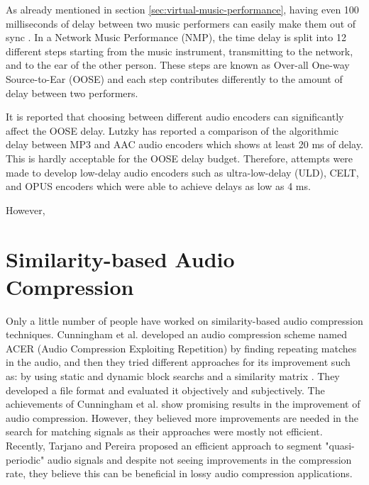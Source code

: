 As already mentioned in section \ref{sec:virtual-music-performance}, having even 100 milliseconds of delay between two music performers can easily make them out of sync \cite{chafe2004effect,bartlette2006effect}. In a Network Music Performance (NMP), the time delay is split into 12 different steps starting from the music instrument, transmitting to the network, and to the ear of the other person. These steps are known as Over-all One-way Source-to-Ear (OOSE) and each step contributes differently to the amount of delay between two performers\cite{carot2009fundamentals, rottondi2016overview}.

It is reported that choosing between different audio encoders can significantly affect the OOSE delay. Lutzky has reported a comparison of the algorithmic delay between MP3 and AAC audio encoders which shows at least 20 ms of delay\cite{lutzky2004guideline}. This is hardly acceptable for the OOSE delay budget. Therefore, attempts were made to develop low-delay audio encoders such as ultra-low-delay (ULD)\cite{schuller2002perceptual}, CELT\cite{valin2009full}, and OPUS\cite{valin2016high} encoders which were able to achieve delays as low as 4 ms. 


However, 

\section{Similarity-based Audio Compression}

Only a little number of people have worked on similarity-based audio compression techniques. Cunningham et al. developed an audio compression scheme named ACER (Audio Compression Exploiting Repetition) by finding repeating matches in the audio\cite{cunningham2005play}, and then they tried different approaches for its improvement such as: by using static and dynamic block searchs\cite{cunningham2007advances} and a similarity matrix \cite{cunningham2014data}. They developed a file format\cite{cunningham2009audio} and evaluated it objectively and subjectively\cite{cunningham2013initial,cunningham2019subjective}. The achievements of Cunningham et al. show promising results in the improvement of audio compression. However, they believed more improvements are needed in the search for matching signals as their approaches were mostly not efficient. Recently, Tarjano and Pereira proposed an efficient approach to segment "quasi-periodic" audio signals and despite not seeing improvements in the compression rate, they believe this can be beneficial in lossy audio compression applications\cite{tarjano2022efficient}.